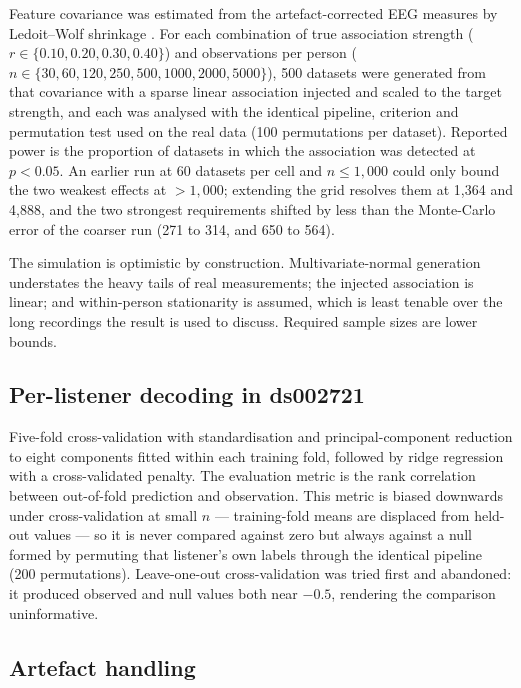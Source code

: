 Feature covariance was estimated from the artefact-corrected EEG measures by
Ledoit--Wolf shrinkage \cite{ledoit2004}. For each combination of true
association strength ($r \in \{0.10, 0.20, 0.30, 0.40\}$) and observations per
person ($n \in \{30, 60, 120, 250, 500, 1000, 2000, 5000\}$), 500 datasets
were generated from that covariance with a sparse linear association injected
and scaled to the target strength, and each was analysed with the identical
pipeline, criterion and permutation test used on the real data (100
permutations per dataset). Reported power is the proportion of datasets in
which the association was detected at $p < 0.05$. An earlier run at 60
datasets per cell and $n \le 1{,}000$ could only bound the two weakest effects
at $> 1{,}000$; extending the grid resolves them at 1{,}364 and 4{,}888, and
the two strongest requirements shifted by less than the Monte-Carlo error of
the coarser run (271 to 314, and 650 to 564).

The simulation is optimistic by construction. Multivariate-normal generation
understates the heavy tails of real measurements; the injected association is
linear; and within-person stationarity is assumed, which is least tenable over
the long recordings the result is used to discuss. Required sample sizes are
lower bounds.

\subsection{Per-listener decoding in ds002721}

Five-fold cross-validation with standardisation and principal-component
reduction to eight components fitted within each training fold, followed by
ridge regression with a cross-validated penalty. The evaluation metric is the
rank correlation between out-of-fold prediction and observation. This metric
is biased downwards under cross-validation at small $n$ --- training-fold means
are displaced from held-out values --- so it is never compared against zero but
always against a null formed by permuting that listener's own labels through
the identical pipeline (200 permutations). Leave-one-out cross-validation was
tried first and abandoned: it produced observed and null values both near
$-0.5$, rendering the comparison uninformative.

\subsection{Artefact handling}

